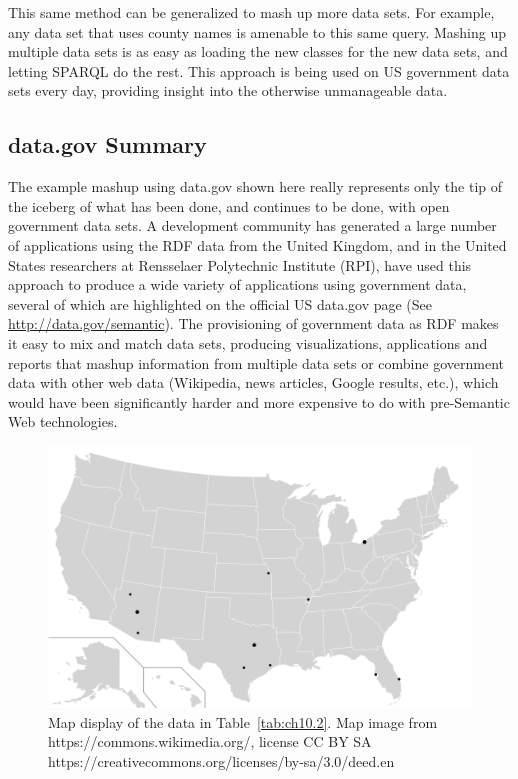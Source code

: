 This same method can be generalized to mash up more data sets. For
example, any data set that uses county names is amenable to this same
query. Mashing up multiple data sets is as easy as loading the new
classes for the new data sets, and letting SPARQL do the rest. This
approach is being used on US government data sets every day, providing
insight into the otherwise unmanageable data.

\subsection{data.gov Summary}

The example mashup using data.gov shown here really represents only the
tip of the iceberg of what has been done, and continues to be done, with
open government data sets. A development community has generated a large
number of applications using the RDF data from the United Kingdom, and
in the United States researchers at Rensselaer Polytechnic Institute
(RPI), have used this approach to produce a wide variety of applications
using government data, several of which are highlighted on the official
US data.gov page (See \url{http://data.gov/semantic}). The provisioning
of government data as RDF makes it easy to mix and match data sets,
producing visualizations, applications and reports that mashup
information from multiple data sets or combine government data with
other web data (Wikipedia, news articles, Google results, etc.), which
would have been significantly harder and more expensive to do with
pre-Semantic Web technologies.

\begin{figure}
\centering
\includegraphics[width=5in]{SWWOv3/media/ch10/figure10-5.png}
\caption{Map display of the data in Table~\ref{tab:ch10.2}.  Map image from https://commons.wikimedia.org/, license CC BY SA https://creativecommons.org/licenses/by-sa/3.0/deed.en}
\label{fig:ch10.2}
\end{figure}


